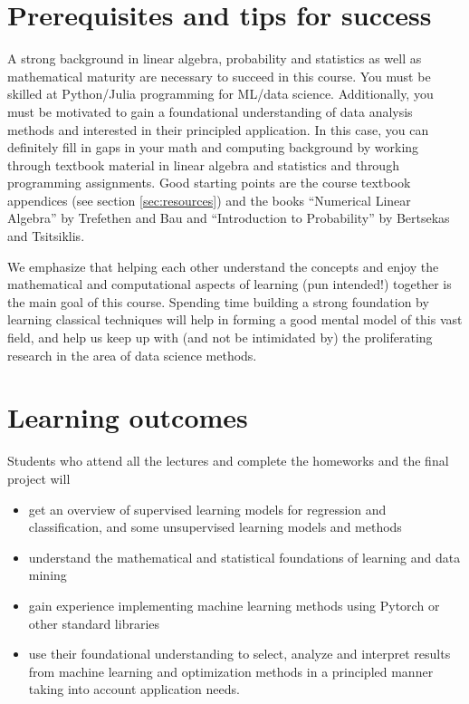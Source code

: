 \documentclass[12pt]{article}
\begin{document}
\section{Prerequisites and tips for success}
A strong background in linear algebra, probability and statistics as well as mathematical maturity are necessary to succeed in this course. You must be skilled at Python/Julia programming for ML/data science. Additionally, you must be motivated to gain a foundational understanding of data analysis methods and interested in their principled application. In this case, you can definitely fill in gaps in your math and computing background by working through textbook material in linear algebra and statistics and through programming assignments. Good starting points are the course textbook appendices (see section \ref{sec:resources}) and the books ``Numerical Linear Algebra'' by Trefethen and Bau and ``Introduction to Probability'' by Bertsekas and Tsitsiklis.

We emphasize that helping each other understand the concepts and enjoy the mathematical and computational aspects of learning (pun intended!) together is the main goal of this course. Spending time building a strong foundation by learning classical techniques will help in forming a good mental model of this vast field, and help us keep up with (and not be intimidated by) the proliferating research in the area of data science methods.

\section{Learning outcomes}

Students who attend all the lectures and complete the homeworks and the final project will 
\begin{itemize}
	\item get an overview of supervised learning models for regression and classification, and some unsupervised learning models and methods 
	\item understand the mathematical and statistical foundations of learning and data mining
	\item gain experience implementing machine learning methods using Pytorch or other standard libraries
	\item use their foundational understanding to select, analyze and interpret results from machine learning and optimization methods in a principled manner taking into account application needs. 
\end{itemize}
\end{document}

